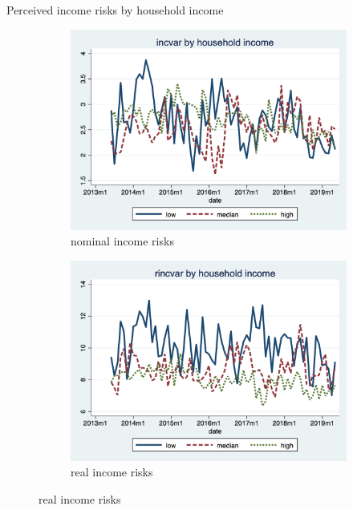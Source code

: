\documentclass{beamer}
\begin{document}
\begin{frame}{Perceived income risks by household income}
	\begin{figure}[ht]
		\label{ts_incvar_HHinc_g_mean}
		\begin{subfigure}[b]{0.7\textwidth}
			\centering
			\caption{nominal income risks}
			\includegraphics[width=\textwidth, height = 0.33\textheight]{figures/ts_incvar_HHinc_g_mean.png}
		\end{subfigure}
		\begin{subfigure}[b]{0.7\textwidth}
			\caption{real income risks}
			\includegraphics[width=\textwidth, height = 0.33\textheight]{figures/ts_rincvar_HHinc_g_mean.png}
		\end{subfigure}
	\end{figure}
\end{frame}
\end{document}
